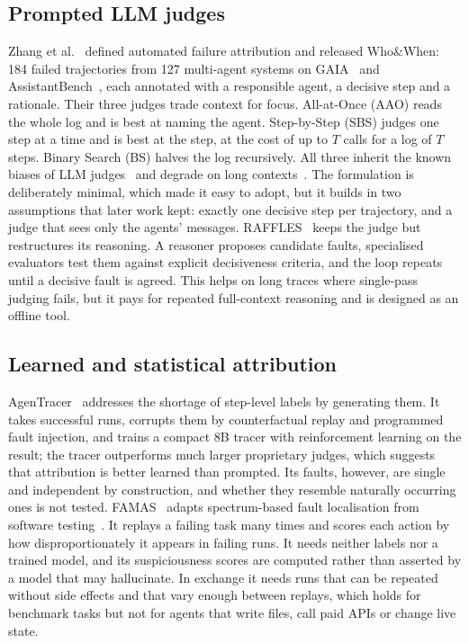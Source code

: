\documentclass[conference]{IEEEtran}
\begin{document}
\subsection{Prompted LLM judges}
Zhang et al.~\cite{zhang2025whowhen} defined automated failure attribution and released Who\&When: 184 failed trajectories from 127 multi-agent systems on GAIA~\cite{mialon2024gaia} and AssistantBench~\cite{yoran2024assistantbench}, each annotated with a responsible agent, a decisive step and a rationale. Their three judges trade context for focus. All-at-Once (AAO) reads the whole log and is best at naming the agent. Step-by-Step (SBS) judges one step at a time and is best at the step, at the cost of up to $T$ calls for a log of $T$ steps. Binary Search (BS) halves the log recursively. All three inherit the known biases of LLM judges~\cite{zheng2023judging} and degrade on long contexts~\cite{liu2024lost}. The formulation is deliberately minimal, which made it easy to adopt, but it builds in two assumptions that later work kept: exactly one decisive step per trajectory, and a judge that sees only the agents' messages. RAFFLES~\cite{zhu2026raffles} keeps the judge but restructures its reasoning. A reasoner proposes candidate faults, specialised evaluators test them against explicit decisiveness criteria, and the loop repeats until a decisive fault is agreed. This helps on long traces where single-pass judging fails, but it pays for repeated full-context reasoning and is designed as an offline tool.

\subsection{Learned and statistical attribution}
AgenTracer~\cite{zhang2026agentracer} addresses the shortage of step-level labels by generating them. It takes successful runs, corrupts them by counterfactual replay and programmed fault injection, and trains a compact 8B tracer with reinforcement learning on the result; the tracer outperforms much larger proprietary judges, which suggests that attribution is better learned than prompted. Its faults, however, are single and independent by construction, and whether they resemble naturally occurring ones is not tested. FAMAS~\cite{ge2026spectrum} adapts spectrum-based fault localisation from software testing~\cite{wong2016survey}. It replays a failing task many times and scores each action by how disproportionately it appears in failing runs. It needs neither labels nor a trained model, and its suspiciousness scores are computed rather than asserted by a model that may hallucinate. In exchange it needs runs that can be repeated without side effects and that vary enough between replays, which holds for benchmark tasks but not for agents that write files, call paid APIs or change live state.
\end{document}
